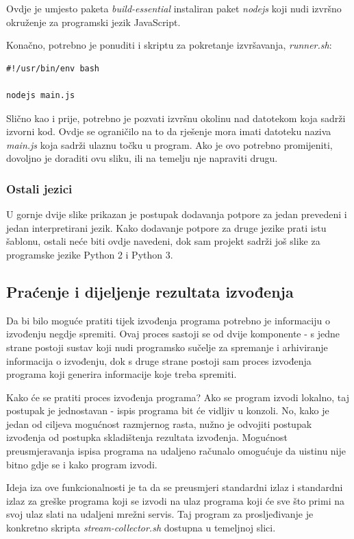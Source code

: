 \documentclass[times, utf8, zavrsni]{fer}
\begin{document}
Ovdje je umjesto paketa {\textit{build-essential}} instaliran paket {\textit{nodejs}} koji nudi izvršno okruženje za programski jezik JavaScript.

Konačno, potrebno je ponuditi i skriptu za pokretanje izvršavanja, {\textit{runner.sh}}:

\begin{lstlisting}
#!/usr/bin/env bash

nodejs main.js
\end{lstlisting}

Slično kao i prije, potrebno je pozvati izvršnu okolinu nad datotekom koja sadrži izvorni kod. Ovdje se ograničilo na to da rješenje mora imati datoteku naziva {\textit{main.js}} koja sadrži ulaznu točku u program. Ako je ovo potrebno promijeniti, dovoljno je doraditi ovu sliku, ili na temelju nje napraviti drugu.

\subsubsection{Ostali jezici}

U gornje dvije slike prikazan je postupak dodavanja potpore za jedan prevedeni i jedan interpretirani jezik. Kako dodavanje potpore za druge jezike prati istu šablonu, ostali neće biti ovdje navedeni, dok sam projekt sadrži još slike za programske jezike Python 2 i Python 3.

\subsection{Praćenje i dijeljenje rezultata izvođenja}

Da bi bilo moguće pratiti tijek izvođenja programa potrebno je informaciju o izvođenju negdje spremiti. Ovaj proces sastoji se od dvije komponente - s jedne strane postoji sustav koji nudi programsko sučelje za spremanje i arhiviranje informacija o izvođenju, dok s druge strane postoji sam proces izvođenja programa koji generira informacije koje treba spremiti.

Kako će se pratiti proces izvođenja programa? Ako se program izvodi lokalno, taj postupak je jednostavan - ispis programa bit će vidljiv u konzoli. No, kako je jedan od ciljeva mogućnost razmjernog rasta, nužno je odvojiti postupak izvođenja od postupka skladištenja rezultata izvođenja. Mogućnost preusmjeravanja ispisa programa na udaljeno računalo omogućuje da uistinu nije bitno gdje se i kako program izvodi.

Ideja iza ove funkcionalnosti je ta da se preusmjeri standardni izlaz i standardni izlaz za greške programa koji se izvodi na ulaz programa koji će sve što primi na svoj ulaz slati na udaljeni mrežni servis. Taj program za prosljeđivanje je konkretno skripta {\textit{stream-collector.sh}} dostupna u temeljnoj slici.
\end{document}
